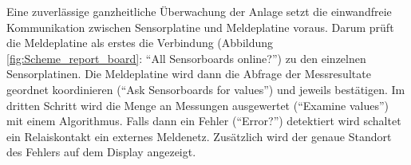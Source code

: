 Eine zuverlässige ganzheitliche Überwachung der Anlage setzt die einwandfreie Kommunikation zwischen Sensorplatine und Meldeplatine voraus. Darum prüft die Meldeplatine als erstes die Verbindung (Abbildung \ref{fig:Scheme_report_board}: ``All Sensorboards online?'') zu den einzelnen Sensorplatinen. Die Meldeplatine wird dann die Abfrage der Messresultate geordnet koordinieren (``Ask Sensorboards for values'') und jeweils bestätigen. Im dritten Schritt wird die Menge an Messungen ausgewertet (``Examine values'') mit einem Algorithmus. Falls dann ein Fehler (``Error?'') detektiert wird schaltet ein Relaiskontakt ein externes Meldenetz. Zusätzlich wird der genaue Standort des Fehlers auf dem Display angezeigt.



%



